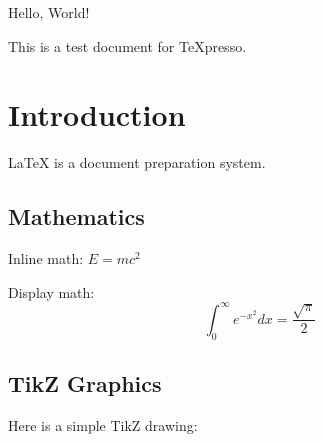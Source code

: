 \documentclass{article}
\begin{document}
Hello, World!

This is a test document for TeXpresso.

\section{Introduction}
LaTeX is a document preparation system.

\subsection{Mathematics}
Inline math: $E = mc^2$

Display math:
\begin{equation}
  \int_0^\infty e^{-x^2} dx = \frac{\sqrt{\pi}}{2}
\end{equation}

\subsection{TikZ Graphics}
Here is a simple TikZ drawing:

\end{document}

